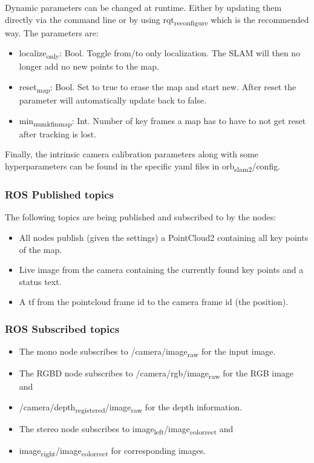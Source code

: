 \documentclass[unrestricted]{meetingnotesminutes}
\begin{document}
Dynamic parameters can be changed at runtime. Either by updating them directly via the command line or by using rqt\textsubscript{reconfigure} which is the recommended way. The parameters are:

\begin{itemize}
\item localize\textsubscript{only}: Bool. Toggle from/to only localization. The SLAM will then no longer add no new points to the map.
\item reset\textsubscript{map}: Bool. Set to true to erase the map and start new. After reset the parameter will automatically update back to false.
\item min\textsubscript{num}\textsubscript{kf}\textsubscript{in}\textsubscript{map}: Int. Number of key frames a map has to have to not get reset after tracking is lost.
\end{itemize}

Finally, the intrinsic camera calibration parameters along with some hyperparameters can be found in the specific yaml files in orb\textsubscript{slam2}/config.

\subsubsection{ROS Published topics}
\label{sec:org803f7eb}

The following topics are being published and subscribed to by the nodes:

\begin{itemize}
\item All nodes publish (given the settings) a PointCloud2 containing all key points of the map.
\item Live image from the camera containing the currently found key points and a status text.
\item A tf from the pointcloud frame id to the camera frame id (the position).
\end{itemize}

\subsubsection{ROS Subscribed topics}
\label{sec:org9c147e4}

\begin{itemize}
\item The mono node subscribes to /camera/image\textsubscript{raw} for the input image.
\item The RGBD node subscribes to /camera/rgb/image\textsubscript{raw} for the RGB image and
\item /camera/depth\textsubscript{registered}/image\textsubscript{raw} for the depth information.
\item The stereo node subscribes to image\textsubscript{left}/image\textsubscript{color}\textsubscript{rect} and
\item image\textsubscript{right}/image\textsubscript{color}\textsubscript{rect} for corresponding images.
\end{itemize}
\end{document}
